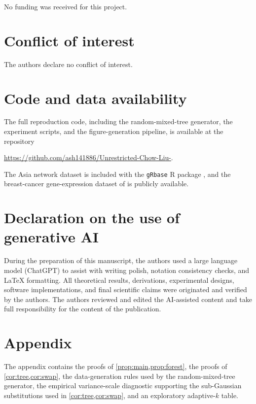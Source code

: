 No funding was received for this project.

\section*{Conflict of interest}

The authors declare no conflict of interest.

\section*{Code and data availability}

The full reproduction code, including the random-mixed-tree
generator, the experiment scripts, and the figure-generation
pipeline, is available at the repository
\begin{center}
\url{https://github.com/ash141886/Unrestricted-Chow-Liu-}.
\end{center}
The Asia network dataset is included with the \texttt{gRbase} R
package \citep{hojsgaard2012graphical}, and the breast-cancer
gene-expression dataset of \citet{west2001predicting} is publicly
available.

\section*{Declaration on the use of generative AI}

During the preparation of this manuscript, the authors used a
large language model (ChatGPT) to assist with writing polish,
notation consistency checks, and LaTeX formatting. All
theoretical results, derivations, experimental designs, software
implementations, and final scientific claims were originated and
verified by the authors. The authors reviewed and edited the
AI-assisted content and take full responsibility for the content
of the publication.

\section*{Appendix}

The appendix contains the proofs of \cref{prop:main,prop:forest},
the proofs of \cref{cor:tree,cor:swap}, the data-generation rules
used by the random-mixed-tree generator, the empirical
variance-scale diagnostic supporting the sub-Gaussian
substitutions used in \cref{cor:tree,cor:swap}, and an exploratory
adaptive-$k$ table.

